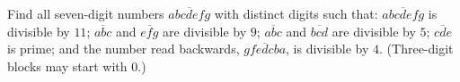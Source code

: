 Find all seven-digit numbers $\overline{abcdefg}$ with distinct digits such that: $\overline{abcdefg}$ is divisible by $11$; $\overline{abc}$ and $\overline{efg}$ are divisible by $9$; $\overline{abc}$ and $\overline{bcd}$ are divisible by $5$; $\overline{cde}$ is prime; and the number read backwards, $\overline{gfedcba}$, is divisible by $4$. (Three-digit blocks may start with $0$.)
